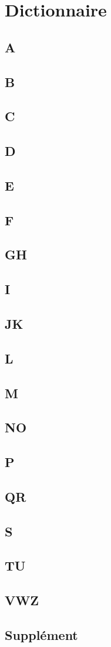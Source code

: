 \chapter{Dictionnaire}
\section{A}

\section{B}

\section{C}

\section{D}

\section{E}

\section{F}

\section{GH}

\section{I}

\section{JK}

\section{L}

\section{M}

\section{NO}

\section{P}

\section{QR}

\section{S}

\section{TU}

\section{VWZ}

\section{Supplément}

